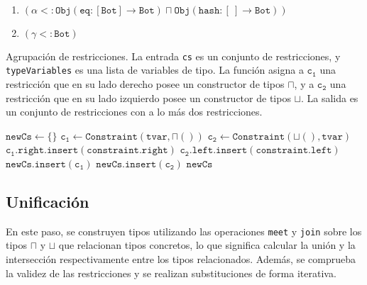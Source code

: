 \begin{ej}\
  \normalfont
  \label{ej3-2}
  \begin{enumerate}
    \item $\mathtt{(\alpha <: Obj(eq : [Bot] \rightarrow Bot) \sqcap Obj(hash : [\ ] \rightarrow Bot))}$
    \item $\mathtt{(\gamma <: Bot)}$
  \end{enumerate}
\end{ej}
\begin{algorithm}\captionsetup{labelsep=newline}
  \centering
  \caption{Agrupación de restricciones. La entrada \texttt{cs} es un conjunto de restricciones, y \texttt{typeVariables} es una lista de variables de tipo. La función asigna a $\mathtt{c_1}$ una restricción que en su lado derecho posee un constructor de tipos $\sqcap$, y a $\mathtt{c_2}$ una restricción que en su lado izquierdo posee un constructor de tipos $\sqcup$. La salida es un conjunto de restricciones con a lo más dos restricciones.}
  \label{pseudogroup}
    \begin{algorithmic}[1]
          \State $\mathtt{newCs\gets \{\}}$
            \State $\mathtt{c_1\gets Constraint(tvar, \sqcap())}$
            \State $\mathtt{c_2\gets Constraint(\sqcup(), tvar)}$
            \For {\texttt{constraint \textbf{in} cs}}
                \State $\mathtt{c_1.right.insert(constraint.right)}$
              \EndIf
                \State $\mathtt{c_2.left.insert(constraint.left)}$
              \EndIf
            \EndFor
              \State $\mathtt{newCs.insert(c_1)}$
            \EndIf
              \State $\mathtt{newCs.insert(c_2)}$
            \EndIf
          \EndFor
          \State \Return $\mathtt{newCs}$
      \EndFunction
    \end{algorithmic}
\end{algorithm}


\subsection{Unificación}
En este paso, se construyen tipos utilizando las operaciones \texttt{meet} y \texttt{join} sobre los tipos $\sqcap$ y $\sqcup$ que relacionan tipos concretos, lo que significa calcular la unión y la intersección respectivamente entre los tipos relacionados. Además, se comprueba la validez de las restricciones y se realizan substituciones de forma iterativa.

